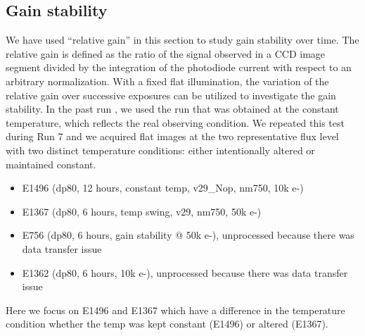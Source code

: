 \subsection{Gain stability}\label{sec:gain-stability-2}
We have used ``relative gain'' in this section to study gain stability over time. 
The relative gain is defined as the ratio of the signal observed in a CCD image segment divided by the integration of the photodiode current with respect to an arbitrary normalization.
With a fixed flat illumination, the variation of the relative gain over successive exposures can be utilized to investigate the gain stability. 
In the past run \citep{2024SPIE13103E..0WU}, we used the run that was obtained at the constant temperature, which reflects the real observing condition. We repeated this test during Run 7 and we acquired flat images at the two representative flux level with two distinct temperature conditions: either intentionally altered or maintained constant.
\begin{itemize}
    \item E1496 (dp80, 12 hours, constant temp, v29\_Nop, nm750, 10k e-)
    \item E1367 (dp80, 6 hours, temp swing, v29, nm750, 50k e-)
    \item E756 (dp80, 6 hours, gain stability @ 50k e-), unprocessed because there was data transfer issue
    \item E1362 (dp80, 6 hours, 10k e-), unprocessed because there was data transfer issue
\end{itemize}

Here we focus on E1496 and E1367 which have a difference in the temperature condition whether the temp was kept constant (E1496) or altered (E1367).

